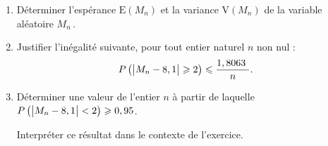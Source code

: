 \documentclass[10pt]{article}
\providecommand{\np}[2][]{{#2~#1}}
\begin{document}
	\begin{enumerate}
		\item Déterminer l'espérance $\mathrm{E}\left(M_{n}\right)$ et la variance $\mathrm{V}\left(M_{n}\right)$ de la variable aléatoire $M_{n}$\,.
		
		\item Justifier l'inégalité suivante, pour tout entier naturel $n$ non nul :
		\[P\left(\left|\strut M_{n}-8,1\right| \geqslant  2\right) \leqslant  \dfrac{\np{1,8063}}{n}.\]
		
		\item Déterminer une valeur de l'entier $n$ à partir de laquelle \quad $P\left(\left|\strut M_{n}-8,1\right|<2\right) \geqslant  0,95$.
		
		Interpréter ce résultat dans le contexte de l'exercice.
	\end{enumerate}
\end{document}
